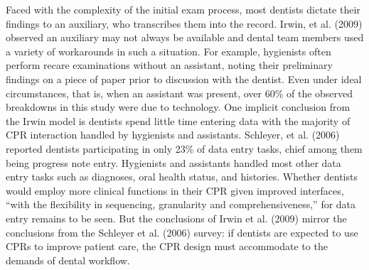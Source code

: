 \documentclass[11pt]{article}
\begin{document}
Faced with the complexity of the initial exam process, most dentists dictate their findings to an auxiliary, who transcribes them into the record. Irwin, et al. (2009) observed an auxiliary may not always be available and dental team members used a variety of workarounds in such a situation. For example, hygienists often perform recare examinations without an assistant, noting their preliminary findings on a piece of paper prior to discussion with the dentist. Even under ideal circumstances, that is, when an assistant was present, over 60\% of the observed breakdowns in this study were due to technology. One implicit conclusion from the Irwin model is dentists spend little time entering data with the majority of CPR interaction handled by hygienists and assistants. Schleyer, et al. (2006) reported dentists participating in only 23\% of data entry tasks, chief among them being progress note entry. Hygienists and assistants handled most other data entry tasks such as diagnoses, oral health status, and histories. Whether dentists would employ more clinical functions in their CPR given improved interfaces, ``with the flexibility in sequencing, granularity and comprehensiveness,'' for data entry remains to be seen. But the conclusions of Irwin et al. (2009) mirror the conclusions from the Schleyer et al. (2006) survey: if dentists are expected to use CPRs to improve patient care, the CPR design must accommodate to the demands of dental workflow.
\end{document}
